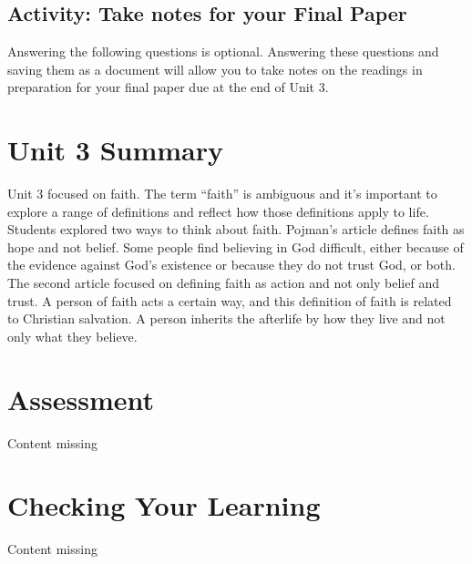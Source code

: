 \documentclass[
]{book}
\begin{document}
\hypertarget{activity-take-notes-for-your-final-paper-1}{%
\subsection*{Activity: Take notes for your Final Paper}\label{activity-take-notes-for-your-final-paper-1}}

\begin{reflect}
Answering the following questions is optional. Answering these questions and saving them as a document will allow you to take notes on the readings in preparation for your final paper due at the end of Unit 3.
\end{reflect}

\hypertarget{unit-3-summary}{%
\section*{Unit 3 Summary}\label{unit-3-summary}}

Unit 3 focused on faith. The term ``faith'' is ambiguous and it's important to explore a range of definitions and reflect how those definitions apply to life. Students explored two ways to think about faith. Pojman's article defines faith as hope and not belief. Some people find believing in God difficult, either because of the evidence against God's existence or because they do not trust God, or both. The second article focused on defining faith as action and not only belief and trust. A person of faith acts a certain way, and this definition of faith is related to Christian salvation. A person inherits the afterlife by how they live and not only what they believe.

\hypertarget{assessment-2}{%
\section*{Assessment}\label{assessment-2}}

{Content missing}

\hypertarget{checking-your-learning-2}{%
\section*{Checking Your Learning}\label{checking-your-learning-2}}

{Content missing}
\end{document}
